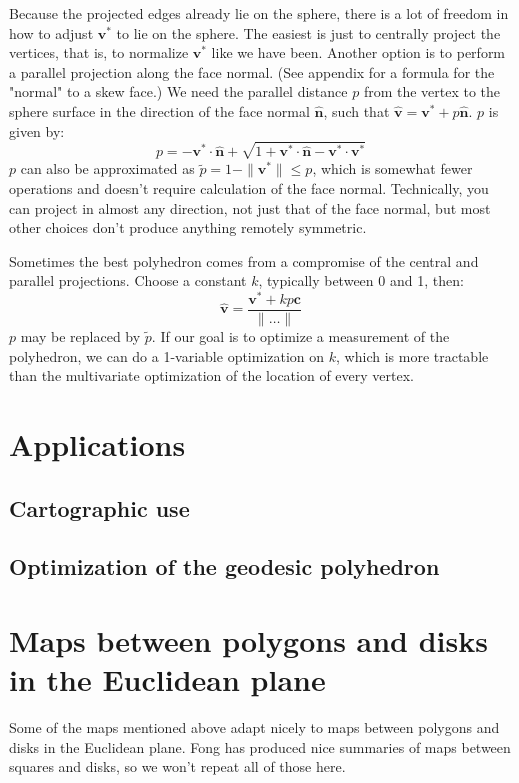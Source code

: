 \documentclass{amsart}[12pt]
\begin{document}
Because the projected edges already lie on the sphere, there is a lot of
freedom in how to adjust $\mathbf v^*$ to lie on the sphere. The
easiest is just to centrally project the vertices, that is, to normalize
$\mathbf v^*$ like we have been. Another option is to perform a parallel
projection along the face normal. (See appendix for a formula for the "normal"
to a skew face.) We need the parallel distance $p$ from the vertex to the
sphere surface in the direction of the face normal $\hat{\mathbf n}$,
such that $\hat{\mathbf v} = \mathbf v^* + p\hat{\mathbf n}$.
$p$ is given by:
\begin{equation}
   p = -\mathbf v^* \cdot \hat{\mathbf n} +
   \sqrt{1+\mathbf v^* \cdot \hat{\mathbf n}-\mathbf v^* \cdot \mathbf v^*}
\end{equation}
$p$ can also be approximated as $\widetilde{p} = 1 - \|\mathbf v^*\|
\leq p$, which is somewhat fewer operations and doesn't require
calculation of the face normal. Technically, you can project in almost any
direction, not just that of the face normal, but most other choices don't
produce anything remotely symmetric.

Sometimes the best polyhedron comes from a compromise of the central and
parallel projections. Choose a constant $k$, typically between 0 and 1, then:
\begin{equation}
  \hat{\mathbf v} = \frac{\mathbf v^* + kp\mathbf c}{\|\dots\|}
\end{equation}
$p$ may be replaced by $\widetilde{p}$. If our goal is to optimize a
measurement of the polyhedron, we can do a 1-variable optimization on $k$,
which is more tractable than the multivariate optimization of the location of
every vertex.

\section{Applications}
\subsection{Cartographic use}

\subsection{Optimization of the geodesic polyhedron}




\appendix
\section{Maps between polygons and disks in the Euclidean plane}
Some of the maps mentioned above adapt nicely to maps between polygons and disks
in the Euclidean plane. Fong \cite{fong15}\cite{fong16} has produced nice
summaries of maps between squares and disks, so we won't repeat all of those
here.
\end{document}
